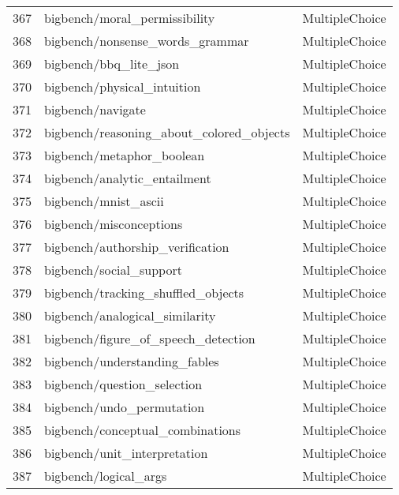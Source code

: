 \documentclass[11pt]{article}
\begin{document}
\begin{longtable}{lll}
367 & bigbench/moral\_permissibility \citep{srivastava2022beyond} & MultipleChoice \\
368 & bigbench/nonsense\_words\_grammar \citep{srivastava2022beyond} & MultipleChoice \\
369 & bigbench/bbq\_lite\_json \citep{srivastava2022beyond} & MultipleChoice \\
370 & bigbench/physical\_intuition \citep{srivastava2022beyond} & MultipleChoice \\
371 & bigbench/navigate \citep{srivastava2022beyond} & MultipleChoice \\
372 & bigbench/reasoning\_about\_colored\_objects \citep{srivastava2022beyond} & MultipleChoice \\
373 & bigbench/metaphor\_boolean \citep{srivastava2022beyond} & MultipleChoice \\
374 & bigbench/analytic\_entailment \citep{srivastava2022beyond} & MultipleChoice \\
375 & bigbench/mnist\_ascii \citep{srivastava2022beyond} & MultipleChoice \\
376 & bigbench/misconceptions \citep{srivastava2022beyond} & MultipleChoice \\
377 & bigbench/authorship\_verification \citep{srivastava2022beyond} & MultipleChoice \\
378 & bigbench/social\_support \citep{srivastava2022beyond} & MultipleChoice \\
379 & bigbench/tracking\_shuffled\_objects \citep{srivastava2022beyond} & MultipleChoice \\
380 & bigbench/analogical\_similarity \citep{srivastava2022beyond} & MultipleChoice \\
381 & bigbench/figure\_of\_speech\_detection \citep{srivastava2022beyond} & MultipleChoice \\
382 & bigbench/understanding\_fables \citep{srivastava2022beyond} & MultipleChoice \\
383 & bigbench/question\_selection \citep{srivastava2022beyond} & MultipleChoice \\
384 & bigbench/undo\_permutation \citep{srivastava2022beyond} & MultipleChoice \\
385 & bigbench/conceptual\_combinations \citep{srivastava2022beyond} & MultipleChoice \\
386 & bigbench/unit\_interpretation \citep{srivastava2022beyond} & MultipleChoice \\
387 & bigbench/logical\_args \citep{srivastava2022beyond} & MultipleChoice \\

\end{longtable}
\end{document}
